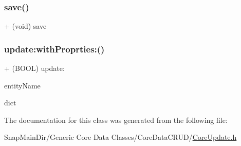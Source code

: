 \hypertarget{interface_core_update_a8da508a5087e88765db53b61ccb56741}{}\label{interface_core_update_a8da508a5087e88765db53b61ccb56741} 
\subsubsection{\texorpdfstring{save()}{save()}}
{\footnotesize\ttfamily + (void) save \begin{DoxyParamCaption}{ }\end{DoxyParamCaption}}

\hypertarget{interface_core_update_ab758dbe726d1c446eec56ec907c305f8}{}\label{interface_core_update_ab758dbe726d1c446eec56ec907c305f8} 
\subsubsection{\texorpdfstring{update\+:with\+Proprties\+:()}{update:withProprties:()}}
{\footnotesize\ttfamily + (B\+O\+OL) update\+: \begin{DoxyParamCaption}\item[{(N\+S\+String $\ast$)}]{entity\+Name }\item[{withProprties:(N\+S\+Dictionary $\ast$)}]{dict }\end{DoxyParamCaption}}



The documentation for this class was generated from the following file\+:\begin{DoxyCompactItemize}
\item 
Snap\+Main\+Dir/\+Generic Core Data Classes/\+Core\+Data\+C\+R\+U\+D/\hyperlink{_core_update_8h}{Core\+Update.\+h}\end{DoxyCompactItemize}
